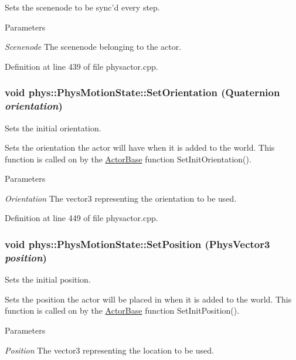 Sets the scenenode to be sync'd every step. 
\begin{DoxyParams}{Parameters}
\item[{\em Scenenode}]The scenenode belonging to the actor. \end{DoxyParams}


Definition at line 439 of file physactor.cpp.

\hypertarget{classphys_1_1PhysMotionState_ac799070edfea4d1c442e3ed0857bcb1d}{
\subsubsection[{SetOrientation}]{\setlength{\rightskip}{0pt plus 5cm}void phys::PhysMotionState::SetOrientation ({\bf Quaternion} {\em orientation})}}
\label{dc/d0d/classphys_1_1PhysMotionState_ac799070edfea4d1c442e3ed0857bcb1d}


Sets the initial orientation. 

Sets the orientation the actor will have when it is added to the world. This function is called on by the \hyperlink{classphys_1_1ActorBase}{ActorBase} function SetInitOrientation(). 
\begin{DoxyParams}{Parameters}
\item[{\em Orientation}]The vector3 representing the orientation to be used. \end{DoxyParams}


Definition at line 449 of file physactor.cpp.

\hypertarget{classphys_1_1PhysMotionState_a083029e5dbcfafd573d47331ff8660cb}{
\subsubsection[{SetPosition}]{\setlength{\rightskip}{0pt plus 5cm}void phys::PhysMotionState::SetPosition ({\bf PhysVector3} {\em position})}}
\label{dc/d0d/classphys_1_1PhysMotionState_a083029e5dbcfafd573d47331ff8660cb}


Sets the initial position. 

Sets the position the actor will be placed in when it is added to the world. This function is called on by the \hyperlink{classphys_1_1ActorBase}{ActorBase} function SetInitPosition(). 
\begin{DoxyParams}{Parameters}
\item[{\em Position}]The vector3 representing the location to be used. \end{DoxyParams}


